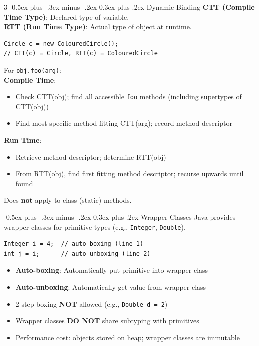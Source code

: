 \documentclass[10pt]{article}
\makeatletter
\renewcommand{\section}{\@startsection{section}{1}{0mm}%
                                {-0.5ex plus -.3ex minus -.2ex}%
                                {0.3ex plus .2ex}%
                                {\normalfont\large\bfseries}}
\makeatother
\begin{document}
\begin{multicols}{3}
\section{Dynamic Binding}
\textbf{CTT (Compile Time Type)}: Declared type of variable.\\
\textbf{RTT (Run Time Type)}: Actual type of object at runtime.
\begin{verbatim}
Circle c = new ColouredCircle();
// CTT(c) = Circle, RTT(c) = ColouredCircle
\end{verbatim}
For \texttt{obj.foo(arg)}:\\
\textbf{Compile Time}:
\begin{itemize}
  \item Check CTT(obj); find all accessible \texttt{foo} methods (including supertypes of CTT(obj))
  \item Find most specific method fitting CTT(arg); record method descriptor
\end{itemize}
\textbf{Run Time}:
\begin{itemize}
  \item Retrieve method descriptor; determine RTT(obj)
  \item From RTT(obj), find first fitting method descriptor; recurse upwards until found
\end{itemize}
Does \textbf{not} apply to class (static) methods.

\section{Wrapper Classes}
Java provides wrapper classes for primitive types (e.g., \texttt{Integer}, \texttt{Double}).
\begin{verbatim}
Integer i = 4;  // auto-boxing (line 1)
int j = i;      // auto-unboxing (line 2)
\end{verbatim}
\begin{itemize}
  \item \textbf{Auto-boxing}: Automatically put primitive into wrapper class
  \item \textbf{Auto-unboxing}: Automatically get value from wrapper class
  \item 2-step boxing \textbf{NOT} allowed (e.g., \texttt{Double d = 2})
  \item Wrapper classes \textbf{DO NOT} share subtyping with primitives
  \item Performance cost: objects stored on heap; wrapper classes are immutable
\end{itemize}


\end{multicols}
\end{document}
